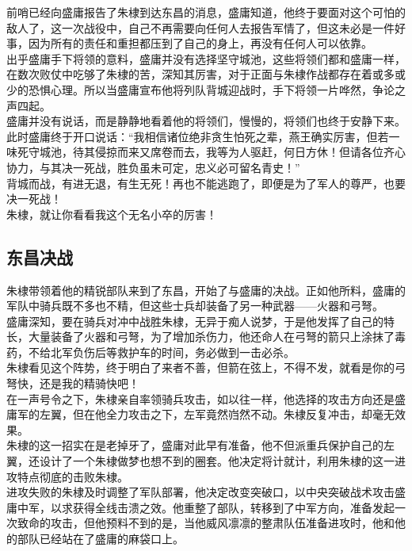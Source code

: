 \begin{multicols}{\theparacolNo}
前哨已经向盛庸报告了朱棣到达东昌的消息，盛庸知道，他终于要面对这个可怕的敌人了，这一次战役中，自己不再需要向任何人去报告军情了，但这未必是一件好事，因为所有的责任和重担都压到了自己的身上，再没有任何人可以依靠。\\

出乎盛庸手下将领的意料，盛庸并没有选择坚守城池，这些将领们都和盛庸一样，在数次败仗中吃够了朱棣的苦，深知其厉害，对于正面与朱棣作战都存在着或多或少的恐惧心理。所以当盛庸宣布他将列队背城迎战时，手下将领一片哗然，争论之声四起。\\

盛庸并没有说话，而是静静地看着他的将领们，慢慢的，将领们也终于安静下来。此时盛庸终于开口说话：“我相信诸位绝非贪生怕死之辈，燕王确实厉害，但若一味死守城池，待其侵掠而来又席卷而去，我等为人驱赶，何日方休！但请各位齐心协力，与其决一死战，胜负虽未可定，忠义必可留名青史！”\\

背城而战，有进无退，有生无死！再也不能逃跑了，即便是为了军人的尊严，也要决一死战！\\

朱棣，就让你看看我这个无名小卒的厉害！\\

\subsection{东昌决战}
朱棣带领着他的精锐部队来到了东昌，开始了与盛庸的决战。正如他所料，盛庸的军队中骑兵既不多也不精，但这些士兵却装备了另一种武器——火器和弓弩。\\

盛庸深知，要在骑兵对冲中战胜朱棣，无异于痴人说梦，于是他发挥了自己的特长，大量装备了火器和弓弩，为了增加杀伤力，他还命人在弓弩的箭只上涂抹了毒药，不给北军负伤后等救护车的时间，务必做到一击必杀。\\

朱棣看见这个阵势，终于明白了来者不善，但箭在弦上，不得不发，就看是你的弓弩快，还是我的精骑快吧！\\

在一声号令之下，朱棣亲自率领骑兵攻击，如以往一样，他选择的攻击方向还是盛庸军的左翼，但在他全力攻击之下，左军竟然岿然不动。朱棣反复冲击，却毫无效果。\\

朱棣的这一招实在是老掉牙了，盛庸对此早有准备，他不但派重兵保护自己的左翼，还设计了一个朱棣做梦也想不到的圈套。他决定将计就计，利用朱棣的这一进攻特点彻底的击败朱棣。\\

进攻失败的朱棣及时调整了军队部署，他决定改变突破口，以中央突破战术攻击盛庸中军，以求获得全线击溃之效。他重整了部队，转移到了中军方向，准备发起一次致命的攻击，但他预料不到的是，当他威风凛凛的整肃队伍准备进攻时，他和他的部队已经站在了盛庸的麻袋口上。\\


\end{multicols}
